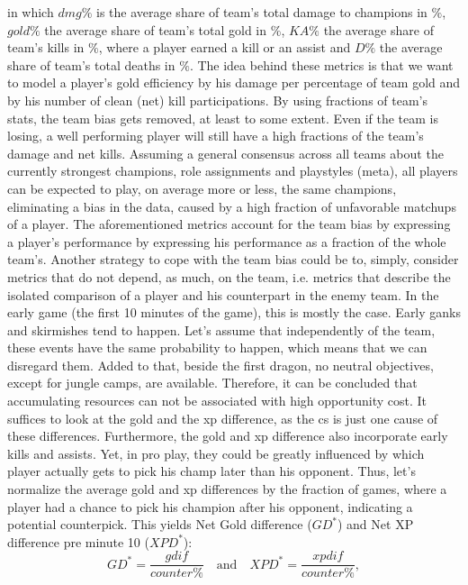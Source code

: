 \documentclass{article}
\begin{document}
in which $dmg\%$ is the average share of team's total damage to champions in $\%$, 
$gold\%$ the average share of team's total gold in $\%$, 
$KA\%$ the average share of team's kills in $\%$, where a player earned a kill or an assist and
$D\%$ the average share of team's total deaths in $\%$.
\newline 
The idea behind these metrics is that we want to model a player's gold efficiency by his damage per percentage of team gold and by his number of clean (net) kill participations. By using fractions of team's stats, the team bias gets removed, at least to some extent. Even if the team is losing, a well performing player will still have a high fractions of the team's damage and net kills. Assuming a general consensus across all teams about the currently strongest champions, role assignments and playstyles (meta), all players can be expected to play, on average more or less, the same champions, eliminating a bias in the data, caused by a high fraction of unfavorable matchups of a player.  \newline
The aforementioned metrics account for the team bias by expressing a player's performance by expressing his performance as a fraction of the whole team's. Another strategy to cope with the team bias could be to, simply, consider metrics that do not depend, as much, on the team, i.e. metrics that describe the isolated comparison of a player and his counterpart in the enemy team. In the early game (the first 10 minutes of the game), this is mostly the case. Early ganks and skirmishes tend to happen. Let's assume that independently of the team, these events have the same probability to happen, which means that we can disregard them. Added to that, beside the first dragon, no neutral objectives, except for jungle camps, are available. Therefore, it can be concluded that accumulating resources can not be associated with high opportunity cost. It suffices to look at the gold and the xp difference, as the cs is just one cause of these differences. Furthermore, the gold and xp difference also incorporate early kills and assists. Yet, in pro play, they could be greatly influenced by which player actually gets to pick his champ later than his opponent. Thus, let's normalize the average gold and xp differences by the fraction of games, where a player had a chance to pick his champion after his opponent, indicating a potential counterpick. This yields Net Gold difference ($GD^*$) and Net XP difference pre minute 10 ($XPD^*$):
\begin{equation}
GD^*  =  \frac{gdif}{counter \%} 
\quad\mathrm{and}\quad
XPD^* =  \frac{xpdif}{counter \%} ,
\end{equation}
\end{document}
